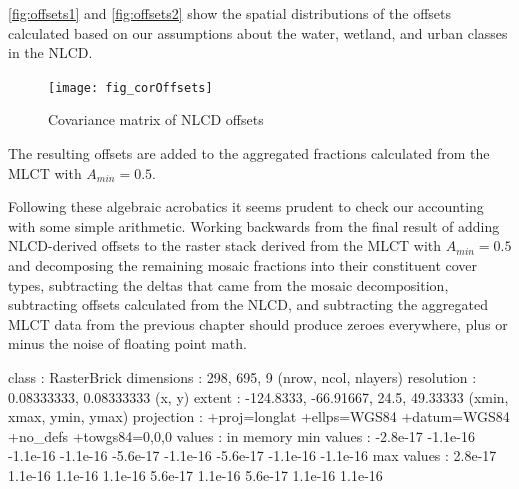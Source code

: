 \autoref{fig:offsets1} and \autoref{fig:offsets2} show the spatial distributions of the offsets calculated based on our assumptions about the water, wetland, and urban classes in the NLCD.




\begin{figure}[hpt]
  \begin{center} 
    \texttt{[image: fig\_corOffsets]}
  \end{center} 
  \caption{Covariance matrix of NLCD offsets}
  \label{fig:corOffsets} 
\end{figure} 

The resulting offsets are added to the aggregated fractions calculated
from the MLCT with $A_{min}=0.5$.  








Following these algebraic acrobatics it seems prudent to check our
accounting with some simple arithmetic.  Working backwards from the
final result of adding NLCD-derived offsets to the raster stack
derived from the MLCT with $A_{min}=0.5$ and decomposing the remaining
mosaic fractions into their constituent cover types, subtracting the
deltas that came from the mosaic decomposition, subtracting offsets
calculated from the NLCD, and subtracting the aggregated MLCT data
from the previous chapter 
should produce zeroes everywhere, plus or minus the noise of floating
point math.




\begin{Schunk}
\begin{Soutput}
class       : RasterBrick 
dimensions  : 298, 695, 9  (nrow, ncol, nlayers)
resolution  : 0.08333333, 0.08333333  (x, y)
extent      : -124.8333, -66.91667, 24.5, 49.33333  (xmin, xmax, ymin, ymax)
projection  : +proj=longlat +ellps=WGS84 +datum=WGS84 +no_defs +towgs84=0,0,0 
values      : in memory
min values  : -2.8e-17 -1.1e-16 -1.1e-16 -1.1e-16 -5.6e-17 -1.1e-16 -5.6e-17 -1.1e-16 -1.1e-16 
max values  : 2.8e-17 1.1e-16 1.1e-16 1.1e-16 5.6e-17 1.1e-16 5.6e-17 1.1e-16 1.1e-16 
\end{Soutput}
\end{Schunk}


